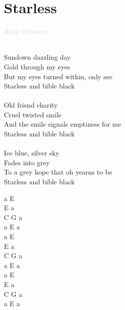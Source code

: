 \documentclass[a5paper, 10pt]{book}
\begin{document}
\newpage
\section{Starless}\textcolor{lightgray}{\textit{King Crimson}}\\~\\
\begin{minipage}[t]{0.65\textwidth}
  Sundown dazzling day\\
  Gold through my eyes\\
  But my eyes turned within, only see\\
  Starless and bible black\\
  \\
  Old friend charity\\
  Cruel twisted smile\\
  And the smile signals emptiness for me\\
  Starless and bible black\\
  \\
  Ice blue, silver sky\\
  Fades into grey\\
  To a grey hope that oh yearns to be\\
  Starless and bible black\\
\end{minipage}
\begin{minipage}[t]{0.35\textwidth}
  a E \\
  E a \\
  C G a\\
  a E a\\

  a E \\
  E a \\
  C G a\\
  a E a\\

  a E \\
  E a \\
  C G a\\
  a E a\\
\end{minipage}
~\\~\\~\\~\\~\\
\end{document}
